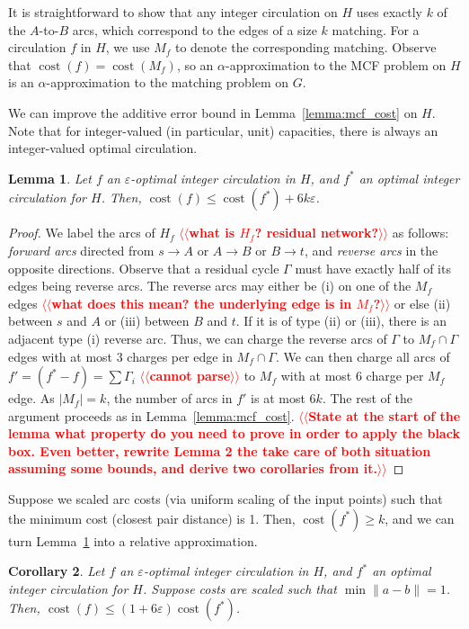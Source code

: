 \documentclass[11pt]{article}
\makeatletter
\def\eps{\varepsilon}
\theoremstyle{plain}
\newtheorem{lemma}{Lemma}[section]
\newtheorem{corollary}[lemma]{Corollary}
\numberwithin{figure}{section}
\def\cost{\operatorname{cost}}
\def\n@te#1{\textsf{\boldmath \textbf{$\langle\!\langle$#1$\rangle\!\rangle$}}\leavevmode}
\def\note#1{\textcolor{red}{\n@te{#1}}}
\makeatother
\begin{document}
It is straightforward to show that any integer circulation on $H$ uses exactly
$k$ of the $A$-to-$B$ arcs, which correspond to the edges of a size $k$
matching.
For a circulation $f$ in $H$, we use $M_f$ to denote the
corresponding matching.
Observe that $\cost(f) = \cost(M_f)$, so an $\alpha$-approximation to the MCF
problem on $H$ is an $\alpha$-approximation to the matching problem on $G$.

We can improve the additive error bound in Lemma~\ref{lemma:mcf_cost} on $H$.
Note that for integer-valued (in particular, unit) capacities, there is always an
integer-valued optimal circulation.
\begin{lemma}
\label{lemma:goldberg_cost_add}
Let $f$ an $\eps$-optimal integer circulation in $H$, and $f^*$ an optimal
integer circulation for $H$.
Then, $\cost(f) \leq \cost(f^*) + 6k\eps$.
\end{lemma}

\begin{proof}
We label the arcs of $H_f$ \note{what is $H_f$? residual network?} as follows: \emph{forward arcs} directed from
$s \to A$ or $A \to B$ or $B \to t$, and \emph{reverse arcs} in the opposite
directions.
Observe that a residual cycle $\Gamma$ must have exactly half of its edges being
reverse arcs.
The reverse arcs may either be (i) on one of the $M_f$ edges \note{what does this mean? the underlying edge is in $M_f$?} or else (ii)
between $s$ and $A$ or (iii) between $B$ and $t$.
If it is of type (ii) or (iii), there is an adjacent type (i) reverse arc.
Thus, we can charge the reverse arcs of $\Gamma$ to $M_f \cap \Gamma$ edges
with at most 3 charges per edge in $M_f \cap \Gamma$.
We can then charge all arcs of $f' = (f^* - f) = \sum \Gamma_i$ \note{cannot parse} to $M_f$ with
at most 6 charge per $M_f$ edge.
As $|M_f| = k$, the number of arcs in $f'$ is at most $6k$.
The rest of the argument proceeds as in Lemma~\ref{lemma:mcf_cost}. \note{State at the start of the lemma what property do you need to prove in order to apply the black box.  Even better, rewrite Lemma 2 the take care of both situation assuming some bounds, and derive two corollaries from it.}
\end{proof}

Suppose we scaled arc costs (via uniform scaling of the input points) such that
the minimum cost (closest pair distance) is 1.
Then, $\cost(f^*) \geq k$, and we can turn Lemma~\ref{lemma:goldberg_cost_add}
into a relative approximation.

\begin{corollary}
\label{corollary:flow_approx}
Let $f$ an $\eps$-optimal integer circulation in $H$, and $f^*$ an optimal
integer circulation for $H$.
Suppose costs are scaled such that $\min \|a - b\| = 1$.
Then, $\cost(f) \leq (1 + 6\eps) \cost(f^*)$.
\end{corollary}
\end{document}
